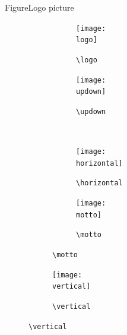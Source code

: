 \documentclass{beamer}
\begin{document}
\begin{frame}[label=logo]{Figure}{Logo picture}
    \centering
    \begin{figure}
        \begin{subfigure}[b]{0.72\textwidth}
            \centering
            \begin{subfigure}[b]{0.3\textwidth}
                \centering
                \texttt{[image: \\logo]}
                \caption{\texttt{\textbackslash logo}}
            \end{subfigure}
            \hspace{0.1\textwidth}
            \begin{subfigure}[b]{0.3\textwidth}
                \centering
                \texttt{[image: \\updown]}
                \caption{\texttt{\textbackslash updown}}
            \end{subfigure}
            \\
            \begin{subfigure}[b]{0.3\textwidth}
                \centering
                \texttt{[image: \\horizontal]}
                \caption{\texttt{\textbackslash horizontal}}
            \end{subfigure}
            \hspace{0.1\textwidth}
            \begin{subfigure}[b]{0.3\textwidth}
                \centering
                \texttt{[image: \\motto]}
                \caption{\texttt{\textbackslash motto}}
            \end{subfigure}
        \end{subfigure}
        \hspace{0.08\textwidth}
        \begin{subfigure}[b]{0.18\textwidth}
            \centering
            \texttt{[image: \\vertical]}
            \caption{\texttt{\textbackslash vertical}}
        \end{subfigure}
    \end{figure}
\end{frame}
\end{document}
